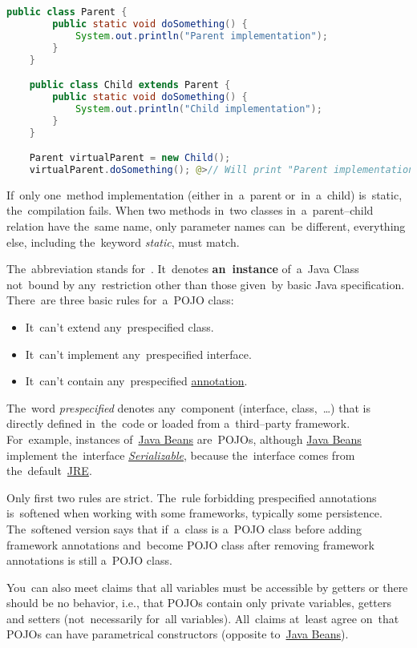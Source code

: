 \example
\begin{lstlisting}[language=Java]
    public class Parent {
        public static void doSomething() {
            System.out.println("Parent implementation");
        }
    }

    public class Child extends Parent {
        public static void doSomething() {
            System.out.println("Child implementation");
        }
    }

    Parent virtualParent = new Child();
    virtualParent.doSomething(); @>// Will print "Parent implementation"
\end{lstlisting}

\note If~only one~method implementation (either in~a~parent or~in~a~child) is~static, the~compilation fails.
When two methods in~two classes in~a~parent--child relation have the~same name, only parameter names can~be different, everything else, including the~keyword \textit{static}, must match.

\label{pojo}
The~abbreviation stands for~.
It~denotes \textbf{an~instance} of~a~Java Class not~bound by any~restriction other than those given~by basic Java specification.
There~are three basic rules for~a~POJO class:
\begin{itemize}
    \item It~can't extend any~prespecified class.
    \item It~can't implement any~prespecified interface.
    \item It~can't contain any~prespecified \hyperref[javaannotation]{annotation}.
\end{itemize}
\noindent The~word \textit{prespecified} denotes any~component (interface, class,~\dots) that is directly defined in~the~code or loaded from a~third--party framework.
For~example, instances of~\hyperref[javabeans]{Java Beans} are~POJOs, although \hyperref[javabeans]{Java Beans} implement the~interface \hyperref[serialization]{\textit{Serializable}}, because the~interface comes from the~default~\hyperref[jdkjrejvm]{JRE}.

\warning Only first two rules are strict.
The~rule forbidding prespecified annotations is~softened when working with some frameworks, typically some persistence.
The~softened version says that if~a~class is a~POJO class before adding framework annotations and~become POJO class after removing framework annotations is still a~POJO class.

\warning You~can also meet claims that all variables must be accessible by getters or there should be no behavior, i.e., that POJOs contain only private variables, getters and setters (not~necessarily for~all variables).
All~claims at~least agree on~that POJOs can have parametrical constructors (opposite to~\hyperref[javabeans]{Java Beans}).

